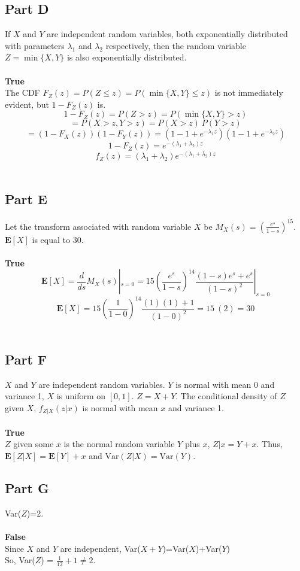 \documentclass{amsart}
\begin{document}
	\subsection{Part D}
	If $X$ and $Y$ are independent random variables, both exponentially distributed with parameters $\lambda_1$ and $\lambda_2$ respectively, then the random variable $Z = \min\{X,Y\}$ is also exponentially distributed.\\
	\\
	\textbf{True}\\
	The CDF $F_Z(z) = P(Z\leq z) = P(\min\{X,Y\}\leq z)$ is not immediately evident, but $1-F_Z(z)$ is.\\
	\[
		1-F_Z(z) = P(Z > z) = P(\min\{X,Y\} > z)
	\]
	\[
		= P(X>z, Y>z) = P(X>z)~P(Y>z)
	\]
	\[
		= \left(1-F_X(z)\right)\left(1-F_Y(z)\right) = \left(1-1+e^{-\lambda_1z}\right)\left(1-1+e^{-\lambda_2z}\right)
	\]
	\[
		1-F_Z(z) = e^{-(\lambda_1 + \lambda_2)z}
	\]
	\[
		f_Z(z) = (\lambda_1+\lambda_2)e^{-(\lambda_1 + \lambda_2)z}
	\]\\
	\subsection{Part E}
	Let the transform associated with random variable $X$ be $M_X(s) = \left(\frac{e^s}{1-s}\right)^{15}$. $\textbf{E}[X]$ is equal to 30.\\
	\\
	\textbf{True}\\
	\[
		\textbf{E}[X] = \frac{d}{ds}M_X(s)|_{s=0} = 15\left(\frac{e^s}{1-s}\right)^{14}\frac{(1-s)e^s + e^s}{(1-s)^2}|_{s=0}
	\]
	\[
		\textbf{E}[X] = 15\left(\frac{1}{1-0}\right)^{14}\frac{(1)(1)+1}{(1-0)^2} = 15~(2) = 30
	\]\\
	\subsection{Part F}
	$X$ and $Y$ are independent random variables. $Y$ is normal with mean 0 and variance 1, $X$ is uniform on $[0,1]$. $Z=X+Y$. The conditional density of $Z$ given $X$, $f_{Z|X}(z|x)$ is normal with mean $x$ and variance 1.\\
	\\
	\textbf{True}\\
	$Z$ given some $x$ is the normal random variable $Y$ plus $x$, $Z|x = Y + x$. Thus, $\textbf{E}[Z|X] = \textbf{E}[Y] + x$ and $\text{Var}(Z|X) = \text{Var}(Y)$.\\
	\subsection{Part G}
	Var($Z$)=2.\\
	\\
	\textbf{False}\\
	Since $X$ and $Y$ are independent, Var($X+Y$)=Var($X$)+Var($Y$)\\So, Var($Z$) = $\frac{1}{12} + 1 \neq 2$.\\
\end{document}

